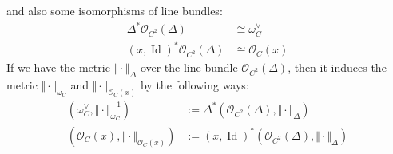 \documentclass[reqno,11pt]{amsart}
\numberwithin{equation}{section}
\theoremstyle{plain}
\theoremstyle{plain}
\numberwithin{equation}{section}
\theoremstyle{remark}
\DeclareMathOperator{\Id}{\operatorname{Id}}
\newcommand{\norm}[1]{\Vert{#1}\Vert}
\begin{document}
\begin{figure}[th]
	\begin{minipage}[t]{.48\textwidth}
		\centering
		\label{fig1}
	\end{minipage}
	\begin{minipage}[t]{.48\textwidth}
		\centering
		\label{fig2}
	\end{minipage}
\end{figure}
and also some isomorphisms of line bundles:
\begin{equation*}
\begin{aligned}
  \Delta^* \mathcal{O}_{C^2}(\Delta)&\cong \omega_C^{\vee}  \\
  (x,\Id)^* \mathcal{O}_{C^2}(\Delta)&\cong \mathcal{O}_C(x)
\end{aligned}
\end{equation*}
If we have the metric $\norm{\cdot}_{\Delta}$ over the line bundle $\mathcal{O}_{C^2}(\Delta)$, then it induces the metric $\norm{\cdot}_{\omega_C}$ and $\norm{\cdot}_{\mathcal{O}_C(x)}$ by the following ways:
\begin{equation*}
\begin{aligned}
 (\omega_C^{\vee},\norm{\cdot}_{\omega_C}^{-1}) &:= \Delta^* (\mathcal{O}_{C^2}(\Delta), \norm{\cdot}_{\Delta}) \\ 
 (\mathcal{O}_C(x),\norm{\cdot}_{\mathcal{O}_C(x)}) &:= (x,\Id)^* (\mathcal{O}_{C^2}(\Delta), \norm{\cdot}_{\Delta}) \\ 
\end{aligned}
\end{equation*}
\end{document}
